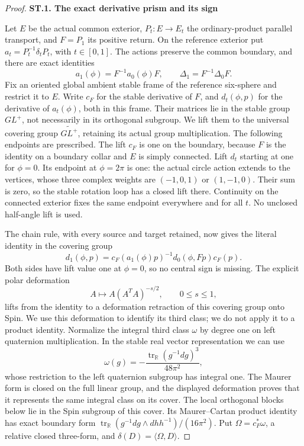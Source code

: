 \begin{proof}
\par

\medskip\noindent\textbf{ST.1. The exact derivative prism and its sign}

\par\nobreak

Let \(E\) be the actual common exterior, \(P_t:E\to E_t\) the
ordinary-product parallel transport, and \(F=P_1\) its positive
return. On the reference exterior put
\(a_t=P_t^{-1}\delta_tP_t\), with \(t\in[0,1]\). The actions
preserve the common boundary, and there are exact identities
\[
 a_1(\phi)=F^{-1}a_0(\phi)F,\qquad
 \Delta_1=F^{-1}\Delta_0F.                            \tag{ST.1}
\]
Fix an oriented global ambient stable frame of the reference
six-sphere and restrict it to \(E\). Write \(c_F\) for the stable
derivative of \(F\), and \(d_t(\phi,p)\) for the derivative of
\(a_t(\phi)\), both in this frame. Their matrices lie in the stable group
\(GL^+\), not necessarily in its orthogonal subgroup. We lift them
to the universal covering group \(\widetilde{GL^+}\), retaining
its actual group multiplication. The following endpoints are
prescribed. The lift \(c_F\) is one on the
boundary, because \(F\) is the identity on a boundary collar and
\(E\) is simply connected. Lift \(d_t\) starting at one for
\(\phi=0\). Its endpoint at \(\phi=2\pi\) is one: the actual
circle action extends to the vertices, whose three complex weights
are \((-1,0,1)\) or \((1,-1,0)\). Their sum is zero, so the
stable rotation loop has a closed lift there. Continuity on the
connected exterior fixes the same endpoint everywhere and for all
\(t\). No unclosed half-angle lift is used.

The chain rule, with every source and target retained, now gives
the literal identity in the covering group
\[
 d_1(\phi,p)=c_F(a_1(\phi)p)^{-1}
                    d_0(\phi,Fp)c_F(p).              \tag{ST.2}
\]
Both sides have lift value one at \(\phi=0\), so no central sign is
missing. The explicit polar deformation
\[
 A\longmapsto A(A^T A)^{-s/2},\qquad 0\leq s\leq1,
\]
lifts from the identity to a deformation retraction of this covering
group onto Spin. We use this deformation to identify its third
class; we do not apply it to a product identity. Normalize the
integral third class \(\omega\) by degree one on left quaternion
multiplication. In the
stable real vector representation we can use
\[
 \omega(g)=-\frac{\operatorname{tr}_{\mathbb R}
                         (g^{-1}dg)^3}{48\pi^2},
\]
whose restriction to the left quaternion subgroup has integral one.
The Maurer form is closed on the full linear group, and the displayed
deformation proves that it represents the same integral class on
its cover. The local orthogonal blocks below lie in the Spin
subgroup of this cover.
Its Maurer--Cartan product identity has exact boundary form
\(\operatorname{tr}_{\mathbb R}(g^{-1}dg\wedge dhh^{-1})/(16\pi^2)\).
Put \(\Omega=c_F^*\omega\), a relative closed three-form, and
\(\delta(D)=\langle\Omega,D\rangle\).


\end{proof}
